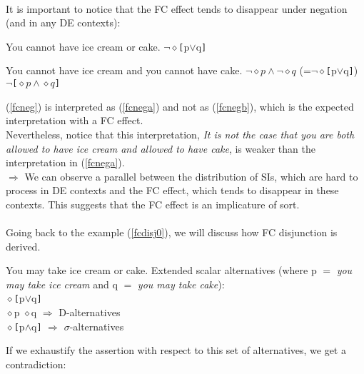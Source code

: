 \documentclass[a4paper,11pt]{article}
\newcommand{\reff}[1]{(\ref{#1})}
\begin{document}
\paragraph{}
It is important to notice that the FC effect tends to disappear under negation (and in any DE contexts):
\begin{exe}
\ex\label{fcneg} You cannot have ice cream or cake. $\neg\diamond$\verb![!p$\vee$q\verb!]!\begin{xlist}
\ex\label{fcnega} You cannot have ice cream and you cannot have cake. $\neg\diamond p\wedge\neg\diamond q$ (=$\neg\diamond$\verb![!p$\vee$q\verb!]!)
\ex\label{fcnegb} $\neg$\verb![!$\diamond p\wedge\diamond q$\verb!]!
\end{xlist}
\end{exe}
\reff{fcneg} is interpreted as \reff{fcnega} and not as \reff{fcnegb}, which is the expected interpretation with a FC effect. 
\\Nevertheless, notice that this interpretation, \textit{It is not the case that you are both allowed to have ice cream and allowed to have cake}, is weaker than the interpretation in \reff{fcnega}.
\\$\Rightarrow$ We can observe a parallel between the distribution of SIs, which are hard to process in DE contexts and the FC effect, which tends to disappear in these contexts. This suggests that the FC effect is an implicature of sort.
\paragraph{}
Going back to the example \reff{fcdisj0}, we will discuss how FC disjunction is derived.

\begin{exe}
	\ex\label{fcdisj}
		\begin{xlist}
			\ex\label{fcdisja} You may take ice cream or cake.
			\ex\label{fcdisjb} Extended scalar alternatives (where p $=$ \emph{you may take ice cream} and q $=$ \emph{you may take cake}):\\
				\indent \hspace{4cm} $\diamond$\verb![!p$\vee$q\verb!]!\\[0.2cm]
				\indent \hspace{2.5cm} $\diamond$p \hspace{3.25cm} $\diamond$q \hfill $\Rightarrow$ D-alternatives\\[0.2cm]
				\indent \hspace{4cm} $\diamond$\verb![!p$\wedge$q\verb!]! \hfill $\Rightarrow$ $\sigma$-alternatives
		\end{xlist}
\end{exe}
\vspace{0.3cm}
If we exhaustify the assertion with respect to this set of alternatives, we get a contradiction:
\end{document}
